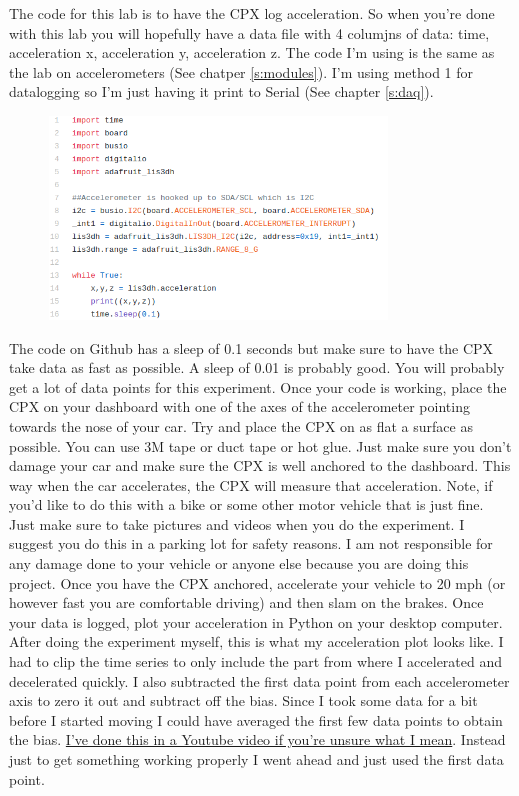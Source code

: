 The code for this lab is to have the CPX log acceleration. So when you’re done with this lab you will hopefully have a data file with 4 columjns of data: time, acceleration x, acceleration y, acceleration z. The code I’m using is the same as the lab on accelerometers (See chatper \ref{s:modules}). I’m using method 1 for datalogging so I’m just having it print to Serial (See chapter \ref{s:daq}).
\begin{figure}[H]
  \begin{center}
    \includegraphics[width=0.8\textwidth]{Figures/accelerometer_code1.png}
  \end{center}
\end{figure}
The code on Github has a sleep of 0.1 seconds but make sure to have the CPX take data as fast as possible. A sleep of 0.01 is probably good. You will probably get a lot of data points for this experiment. Once your code is working, place the CPX on your dashboard with one of the axes of the accelerometer pointing towards the nose of your car. Try and place the CPX on as flat a surface as possible. You can use 3M tape or duct tape or hot glue. Just make sure you don’t damage your car and make sure the CPX is well anchored to the dashboard. This way when the car accelerates, the CPX will measure that acceleration. Note, if you’d like to do this with a bike or some other motor vehicle that is just fine. Just make sure to take pictures and videos when you do the experiment. I suggest you do this in a parking lot for safety reasons. I am not responsible for any damage done to your vehicle or anyone else because you are doing this project. Once you have the CPX anchored, accelerate your vehicle to 20 mph (or however fast you are comfortable driving) and then slam on the brakes. Once your data is logged, plot your acceleration in Python on your desktop computer. After doing the experiment myself, this is what my acceleration plot looks like. I had to clip the time series to only include the part from where I accelerated and decelerated quickly. I also subtracted the first data point from each accelerometer axis to zero it out and subtract off the bias. Since I took some data for a bit before I started moving I could have averaged the first few data points to obtain the bias. \href{https://www.youtube.com/watch?v=e4xs9Ky7_YI&feature=youtu.be}{I’ve done this in a Youtube video if you’re unsure what I mean}. Instead just to get something working properly I went ahead and just used the first data point.
